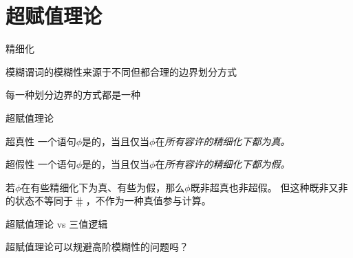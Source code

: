\documentclass{zhslides}
\begin{document}
\section{超赋值理论}

\begin{frame}{精细化}
  
  \bit
    \item 模糊谓词的模糊性来源于不同但都合理的边界划分方式
    \item 每一种划分边界的方式都是一种
  \eit
  
\end{frame}


\begin{frame}{超赋值理论}
  
  \begin{definition*}{超真性}
    一个语句$\phi$是的，当且仅当$\phi$在\em{所有}容许的精细化下都为真。
  \end{definition*}
  \pause
  
  \begin{definition*}{超假性}
    一个语句$\phi$是的，当且仅当$\phi$在\em{所有}容许的精细化下都为假。
  \end{definition*}
  \pause
  
  若$\phi$在有些精细化下为真、有些为假，那么$\phi$既非超真也非超假。
  \pause
  但这种既非又非的状态不等同于$\hash$，不作为一种真值参与计算。
  
\end{frame}


\begin{frame}{超赋值理论 vs 三值逻辑}
  
  \begin{brainstorm*}{}
    超赋值理论可以规避高阶模糊性的问题吗？
  \end{brainstorm*}
  
\end{frame}
\end{document}
